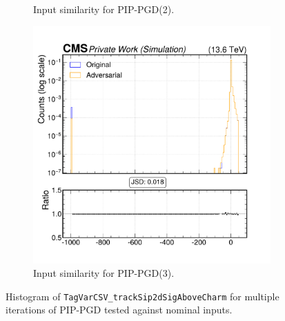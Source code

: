 \begin{figure}[htbp]
\begin{subfigure}[t]{0.32\textwidth}
    \caption*{Input similarity for PIP-PGD(2).}
  \end{subfigure}\hfill
  \begin{subfigure}[t]{0.32\textwidth}
    \includegraphics[width=\linewidth]{media/output/features/compare/combined_it_3/cmp_global_features_TagVarCSV_trackSip2dSigAboveCharm.pdf}
    \caption*{Input similarity for PIP-PGD(3).}
  \end{subfigure}

  \caption*{Histogram of \texttt{TagVarCSV\_trackSip2dSigAboveCharm} for multiple iterations of PIP-PGD tested against nominal inputs.}
  \label{fig:combined_input_TagVarCSV_trackSip2dSigAboveCharm}
\end{figure}

